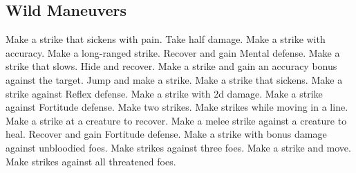 \small
\subsection{Wild Maneuvers}\label{Wild Maneuvers}
\begin{spelllist}
 Make a strike that sickens with pain.
 Take half damage.
 Make a strike with  accuracy.
 Make a long-ranged strike.
 Recover and gain  Mental defense.
 Make a strike that slows.
 Hide and recover.
 Make a strike and gain an accuracy bonus against the target.
 Jump and make a strike.
 Make a strike that sickens.
 Make a strike against Reflex defense.
 Make a strike with \plus2d damage.
 Make a strike against Fortitude defense.
 Make two strikes.
 Make strikes while moving in a line.
 Make a strike at a creature to recover.
 Make a melee strike against a creature to heal.
 Recover and gain  Fortitude defense.
 Make a strike with bonus damage against unbloodied foes.
 Make strikes against three foes.
 Make a strike and move.
 Make strikes against all threatened foes.
\end{spelllist}
